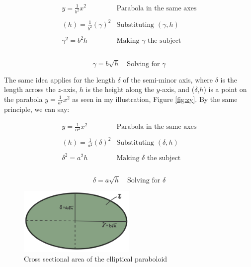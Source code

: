 \documentclass[12pt]{article}
\begin{document}
$$
\begin{array}{l|c}
    y = \frac{1}{b^2}x^2 & \text{Parabola in the same axes} \\ \\
    (h) = \frac{1}{b^2}(\gamma)^2 & \text{Substituting } (\gamma, h) \\ \\
    \gamma^2 = b^2 h & \text{Making } \gamma \text{ the subject} \\ \\
 \end{array}
$$

\begin{equation}\label{solve.gammaparab}
    \boxed{\gamma = b\sqrt{h}}  \quad \text{Solving for } \gamma
\end{equation}

The same idea applies for the length $\delta$ of the semi-minor axis, where $\delta$ is the length across the $z$-axis, $h$ is the height along the $y$-axis, and ($\delta$,$h$) is a point on the parabola $y=\frac{1}{a^2}x^2$ as seen in my illustration, Figure \ref{fig:zy}. By the same principle, we can say:

$$
\begin{array}{l|c}
    y = \frac{1}{\alpha^2}x^2 & \text{Parabola in the same axes} \\ \\
    (h) = \frac{1}{a^2}(\delta)^2 & \text{Substituting } (\delta, h) \\ \\
    \delta^2 = a^2 h & \text{Making } \delta \text{ the subject} \\ \\
 \end{array}
$$

\begin{equation}\label{solve.delta}
    \boxed{\delta = a\sqrt{h}}  \quad \text{Solving for } \delta
\end{equation}

\begin{figure}[h]
    \centering
    \includegraphics[width=0.5\textwidth]{images/cross.jpg}
    \caption{Cross sectional area of the elliptical paraboloid}
    \label{fig:cross}
\end{figure}
\end{document}
